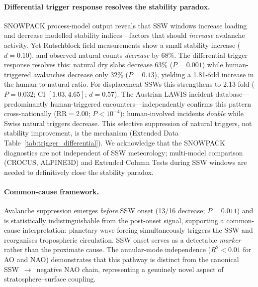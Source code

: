 \documentclass[11pt,letterpaper]{article}
\begin{document}
\paragraph{Differential trigger response resolves the stability paradox.} SNOWPACK process-model output reveals that SSW windows increase loading and decrease modelled stability indices---factors that should \emph{increase} avalanche activity. Yet Rutschblock field measurements show a small stability increase ($d = 0.10$), and observed natural counts \emph{decrease} by 68\%. The differential trigger response resolves this: natural dry slabs decrease 63\% ($P = 0.001$) while human-triggered avalanches decrease only 32\% ($P = 0.13$), yielding a 1.81-fold increase in the human-to-natural ratio. For displacement SSWs this strengthens to 2.13-fold ($P = 0.032$; CI $[1.03, 4.65]$; $d = 0.57$). The Austrian LAWIS incident database---predominantly human-triggered encounters---independently confirms this pattern cross-nationally ($\mathrm{RR} = 2.00$; $P < 10^{-4}$): human-involved incidents \emph{double} while Swiss natural triggers decrease. This selective suppression of natural triggers, not stability improvement, is the mechanism (Extended Data Table~\ref{tab:trigger_differential}). We acknowledge that the SNOWPACK diagnostics are not independent of SSW meteorology; multi-model comparison (CROCUS, ALPINE3D) and Extended Column Tests during SSW windows are needed to definitively close the stability paradox.

\paragraph{Common-cause framework.} Avalanche suppression emerges \emph{before} SSW onset (13/16 decrease; $P = 0.011$) and is statistically indistinguishable from the post-onset signal, supporting a common-cause interpretation: planetary wave forcing simultaneously triggers the SSW and reorganises tropospheric circulation\cite{Polvani2004}. SSW onset serves as a detectable \emph{marker} rather than the proximate cause. The annular-mode independence ($R^2 < 0.01$ for AO and NAO) demonstrates that this pathway is distinct from the canonical SSW~$\to$~negative NAO chain, representing a genuinely novel aspect of stratosphere--surface coupling.
\end{document}
